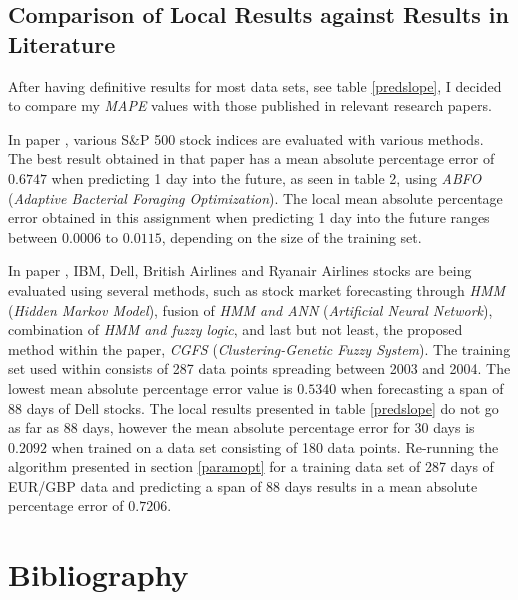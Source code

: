 \documentclass[a4paper,12pt]{article}
\begin{document}
\subsection{Comparison of Local Results against Results in Literature} \label{comp}
	
	After having definitive results for most data sets, see table \ref{predslope}, I decided to compare my \textit{MAPE} values with those published in relevant research papers.
	
	In paper \cite{majhi2009efficient}, various S\&P 500 stock indices are evaluated with various methods. The best result obtained in that paper has a mean absolute percentage error of $0.6747$ when predicting 1 day into the future, as seen in table 2, using \textit{ABFO} (\textit{Adaptive Bacterial Foraging
	Optimization}). The local mean absolute percentage error obtained in this assignment when predicting 1 day into the future ranges between $0.0006$ to $0.0115$, depending on the size of the training set.
	
	In paper \cite{hadavandi2010integration}, IBM, Dell, British Airlines and Ryanair Airlines stocks are being evaluated using several methods, such as stock market forecasting through \textit{HMM}\cite{hassan2005stock} (\textit{Hidden Markov Model}), fusion of \textit{HMM and ANN}\cite{hassan2007fusion} (\textit{Artificial Neural Network}), combination of \textit{HMM and fuzzy logic}\cite{hassan2009combination}, and last but not least, the proposed method within the paper, \textit{CGFS} (\textit{Clustering-Genetic Fuzzy System}). The training set used within consists of 287 data points spreading between 2003 and 2004. The lowest mean absolute percentage error value is $0.5340$ when forecasting a span of 88 days of Dell stocks. The local results presented in table \ref{predslope} do not go as far as 88 days, however the mean absolute percentage error for 30 days is $0.2092$ when trained on a data set consisting of 180 data points. Re-running the algorithm presented in section \ref{paramopt} for a training data set of 287 days of EUR/GBP data and predicting a span of 88 days results in a mean absolute percentage error of $0.7206$.
	
\newpage
\section{Bibliography}

	\begingroup
	\renewcommand{\section}[2]{}
		
		
	\endgroup
\end{document}
